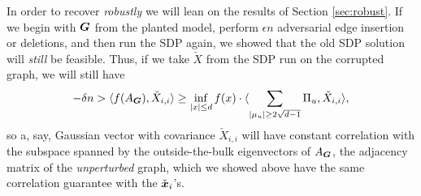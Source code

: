 In order to recover \emph{robustly} we will lean on the results of Section \ref{sec:robust}. If we begin with $\boldsymbol{G}$ from the planted model, perform $\epsilon n$ adversarial edge insertion or deletions, and then run the SDP again, we showed that the old SDP solution will \emph{still} be feasible. Thus, if we take $\check X$ from the SDP run on the corrupted graph, we will still have
\begin{align*}
	-\delta n > \langle f(A_{\boldsymbol{G}}), \check X_{i,i} \rangle \ge \inf_{|x| \le d} f(x) \cdot \langle \sum_{|\mu_u| \ge 2\sqrt{d-1}} \Pi_u, \check X_{i,i} \rangle,
\end{align*}
so a, say, Gaussian vector with covariance $\check X_{i,i}$ will have constant correlation with the subspace spanned by the outside-the-bulk eigenvectors of $A_{\boldsymbol{G}}$, the adjacency matrix of the \emph{unperturbed} graph, which we showed above have the same correlation guarantee with the $\check {{\boldsymbol{x}}}_{i}$'s.

